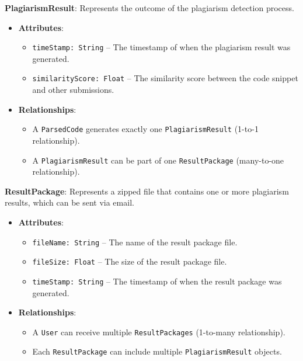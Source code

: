 \documentclass[12pt]{article}
\begin{document}
\textbf{PlagiarismResult}: Represents the outcome of the plagiarism detection process.
\begin{itemize}
    \item \textbf{Attributes}:
    \begin{itemize}
        \item \texttt{timeStamp: String} -- The timestamp of when the plagiarism result was generated.
        \item \texttt{similarityScore: Float} -- The similarity score between the code snippet and other submissions.
    \end{itemize}
    \item \textbf{Relationships}:
    \begin{itemize}
        \item A \texttt{ParsedCode} generates exactly one \texttt{PlagiarismResult} (1-to-1 relationship).
        \item A \texttt{PlagiarismResult} can be part of one \texttt{ResultPackage} (many-to-one relationship).
    \end{itemize}
\end{itemize}

\textbf{ResultPackage}: Represents a zipped file that contains one or more plagiarism results, which can be sent via email.
\begin{itemize}
    \item \textbf{Attributes}:
    \begin{itemize}
        \item \texttt{fileName: String} -- The name of the result package file.
        \item \texttt{fileSize: Float} -- The size of the result package file.
        \item \texttt{timeStamp: String} -- The timestamp of when the result package was generated.
    \end{itemize}
    \item \textbf{Relationships}:
    \begin{itemize}
        \item A \texttt{User} can receive multiple \texttt{ResultPackages} (1-to-many relationship).
        \item Each \texttt{ResultPackage} can include multiple \texttt{PlagiarismResult} objects.
    \end{itemize}
\end{itemize}
\end{document}
